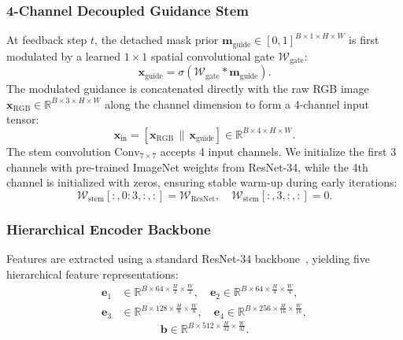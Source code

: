 \subsubsection{4-Channel Decoupled Guidance Stem}
At feedback step $t$, the detached mask prior $\mathbf{m}_{\text{guide}} \in [0, 1]^{B \times 1 \times H \times W}$ is first modulated by a learned $1 \times 1$ spatial convolutional gate $\mathcal{W}_{\text{gate}}$:
\begin{equation}
  \mathbf{x}_{\text{guide}} = \sigma\left(\mathcal{W}_{\text{gate}} * \mathbf{m}_{\text{guide}}\right).
\end{equation}
The modulated guidance is concatenated directly with the raw RGB image $\mathbf{x}_{\text{RGB}} \in \mathbb{R}^{B \times 3 \times H \times W}$ along the channel dimension to form a 4-channel input tensor:
\begin{equation}
  \mathbf{x}_{\text{in}} = \left[\mathbf{x}_{\text{RGB}} \,\|\, \mathbf{x}_{\text{guide}}\right] \in \mathbb{R}^{B \times 4 \times H \times W}.
\end{equation}
The stem convolution $\text{Conv}_{7 \times 7}$ accepts 4 input channels. We initialize the first 3 channels with pre-trained ImageNet weights from ResNet-34, while the 4th channel is initialized with zeros, ensuring stable warm-up during early iterations:
\begin{equation}
  \mathcal{W}_{\text{stem}}[:, 0:3, :, :] = \mathcal{W}_{\text{ResNet}}, \quad \mathcal{W}_{\text{stem}}[:, 3, :, :] = 0.
\end{equation}

\subsubsection{Hierarchical Encoder Backbone}
Features are extracted using a standard ResNet-34 backbone~\cite{he2016deep}, yielding five hierarchical feature representations:
\begin{align}
  \mathbf{e}_1 &\in \mathbb{R}^{B \times 64 \times \frac{H}{2} \times \frac{W}{2}}, \quad
  \mathbf{e}_2 \in \mathbb{R}^{B \times 64 \times \frac{H}{4} \times \frac{W}{4}}, \\
  \mathbf{e}_3 &\in \mathbb{R}^{B \times 128 \times \frac{H}{8} \times \frac{W}{8}}, \quad
  \mathbf{e}_4 \in \mathbb{R}^{B \times 256 \times \frac{H}{16} \times \frac{W}{16}},
\end{align}
\begin{equation}
  \mathbf{b} \in \mathbb{R}^{B \times 512 \times \frac{H}{32} \times \frac{W}{32}}.
\end{equation}

